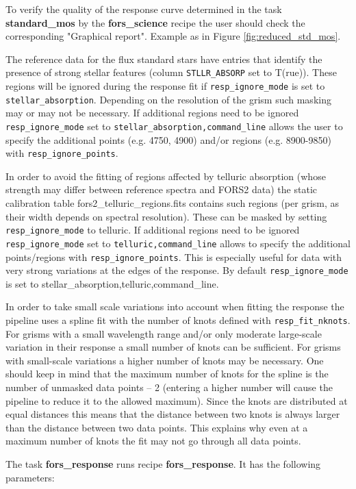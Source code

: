 To verify the quality of the response curve determined in the task {\bf standard\_mos} by the {\bf fors\_science} recipe the user should check the corresponding "Graphical report". Example as in Figure \ref{fig:reduced_std_mos}.

The reference data for the flux standard stars have entries that identify the presence of strong stellar features (column {\tt STLLR\_ABSORP} set to T(rue)). These regions will be ignored during the response fit if {\tt resp\_ignore\_mode}
is set to {\tt stellar\_absorption}. Depending on the resolution of the grism such masking may or may not be necessary. If additional regions need to be ignored {\tt resp\_ignore\_mode} set to {\tt stellar\_absorption,command\_line} allows the user to specify the additional points (e.g. 4750, 4900) and/or regions (e.g.
8900-9850) with {\tt resp\_ignore\_points}.

In order to avoid the fitting of regions affected by telluric absorption (whose strength may differ between reference spectra and FORS2 data) the static calibration table fors2\_telluric\_regions.fits contains such regions (per grism, as their width depends on spectral resolution). These can be masked by setting {\tt resp\_ignore\_mode} to telluric. If additional regions need to be ignored {\tt resp\_ignore\_mode} set to {\tt telluric,command\_line} allows to specify the additional points/regions with {\tt resp\_ignore\_points}. This is especially useful for data with very strong variations at the edges of the response.
By default {\tt resp\_ignore\_mode} is set to stellar\_absorption,telluric,command\_line.

In order to take small scale variations into account when fitting the response the pipeline uses a spline fit with
the number of knots defined with {\tt resp\_fit\_nknots}. For grisms with a small wavelength range and/or only moderate large-scale variation in their response a small number of knots can be sufficient. For grisms with small-scale variations a higher number of knots may be necessary. One should keep in mind that the maximum number of knots for the spline is the number of unmasked data points – 2 (entering a higher number will cause the pipeline to reduce it to the allowed maximum). Since the knots are distributed at equal distances this means that the distance between two knots is always larger than the distance between two data points. This explains why even at a maximum number of knots the fit may not go through all data points.


The task {\bf fors\_response} runs recipe {\bf fors\_response}. 
It has the following parameters:


